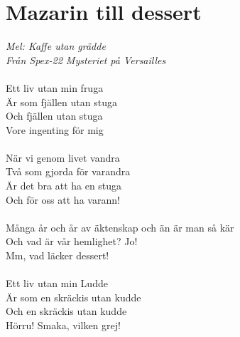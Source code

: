 \documentclass[a5paper,15pt]{article}
\begin{document}
\section{Mazarin till dessert}
\emph{Mel: Kaffe utan grädde
\\
Från Spex-22 Mysteriet på Versailles} \\
\\
Ett liv utan min fruga\\
Är som fjällen utan stuga\\
Och fjällen utan stuga\\
Vore ingenting för mig\\
\\
När vi genom livet vandra\\
Två som gjorda för varandra\\
Är det bra att ha en stuga\\
Och för oss att ha varann!\\
\\
Många år och år av äktenskap och än är man så kär\\
Och vad är vår hemlighet? Jo!\\
Mm, vad läcker dessert!\\
\\
Ett liv utan min Ludde\\
Är som en skräckis utan kudde\\
Och en skräckis utan kudde\\
Hörru! Smaka, vilken grej!
\\
\end{document}
